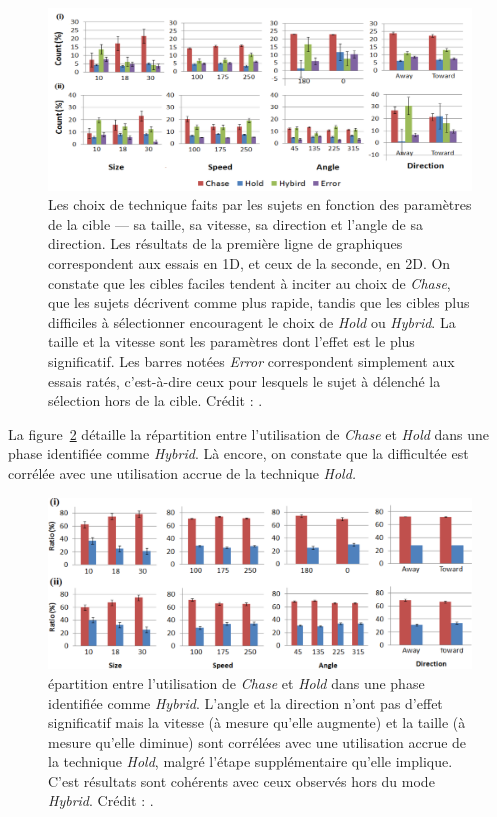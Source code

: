	\begin{figure}[!htb]
		\centering
		\includegraphics[width=\textwidth]{figures/ch2/holdTech}
		\caption[\emph{Hold} -- choix de la technique]{Les choix de technique faits par les sujets en fonction des paramètres de la cible --- sa taille, sa vitesse, sa direction et l'angle de sa direction. Les résultats de la première ligne de graphiques correspondent aux essais en 1D, et ceux de la seconde, en 2D. On constate que les cibles \og faciles \fg{}  tendent à inciter au choix de \emph{Chase}, que les sujets décrivent comme plus rapide, tandis que les cibles plus difficiles à sélectionner encouragent le choix de \emph{Hold} ou \emph{Hybrid}. La taille et la vitesse sont les paramètres dont l'effet est le plus significatif. Les barres notées \emph{Error} correspondent simplement aux essais ratés, c'est-à-dire ceux pour lesquels le sujet à délenché la sélection hors de la cible. Crédit : \cite{hajri2011moving}.}
		\label{fig:holdTech}
	\end{figure}
	
	La figure~\ref{fig:holdRatio} détaille la répartition entre l'utilisation de \emph{Chase} et \emph{Hold} dans une phase identifiée comme \emph{Hybrid}. Là encore, on constate que la difficultée est corrélée avec une utilisation accrue de la technique \emph{Hold.}
	
	\begin{figure}[!htb]
		\centering
		\includegraphics[width=\textwidth]{figures/ch2/holdRatio}
		\caption[\emph{Hold} -- répartition \emph{Hold/Chase} en mode \emph{Hybrid}]{épartition entre l'utilisation de \emph{Chase} et \emph{Hold} dans une phase identifiée comme \emph{Hybrid}. L'angle et la direction n'ont pas d'effet significatif mais la vitesse (à mesure qu'elle augmente) et la taille (à mesure qu'elle diminue) sont corrélées avec une utilisation accrue de la technique \emph{Hold}, malgré l'étape supplémentaire qu'elle implique. C'est résultats sont cohérents avec ceux observés hors du mode \emph{Hybrid}. Crédit : \cite{hajri2011moving}.}
		\label{fig:holdRatio}
	\end{figure}
	
